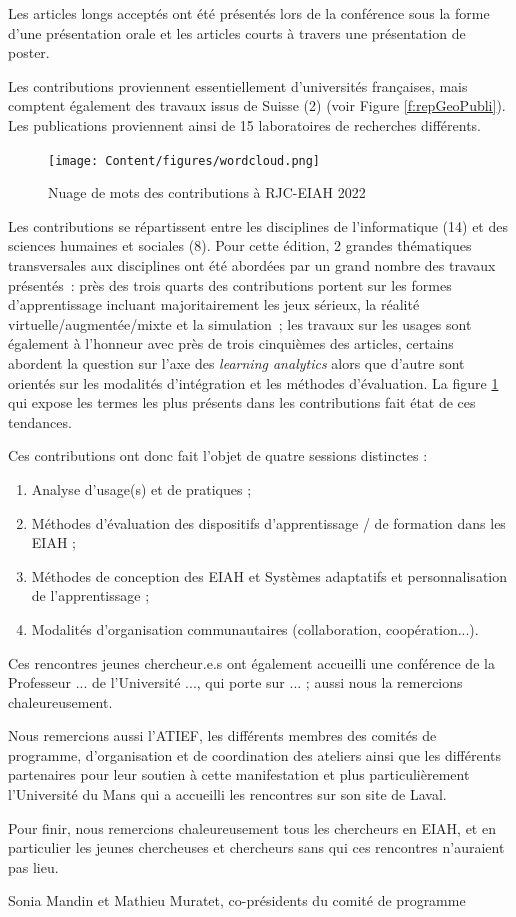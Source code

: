 Les articles longs acceptés ont été présentés lors de la conférence sous la forme d'une présentation orale et les articles courts à travers une présentation de poster.

Les contributions proviennent essentiellement d’universités françaises, mais comptent également des travaux issus de Suisse (2) (voir Figure \ref{f:repGeoPubli}). Les publications proviennent ainsi de 15 laboratoires de recherches différents.

\begin{figure}[!h]
	\centering
	\texttt{[image: Content/figures/wordcloud.png]}
	\caption{Nuage de mots des contributions à RJC-EIAH 2022}
	\label{f:wordCloud}
\end{figure}

Les contributions se répartissent entre les disciplines de l’informatique (14) et des sciences humaines et sociales (8). Pour cette édition, 2 grandes thématiques transversales aux disciplines ont été abordées par un grand nombre des travaux présentés~: près des trois quarts des contributions portent sur les formes d'apprentissage incluant majoritairement les jeux sérieux, la réalité virtuelle/augmentée/mixte et la simulation~; les travaux sur les usages sont également à l'honneur avec près de trois cinquièmes des articles, certains abordent la question sur l'axe des \textit{learning analytics} alors que d'autre sont orientés sur les modalités d'intégration et les méthodes d'évaluation. La figure \ref{f:wordCloud} qui expose les termes les plus présents dans les contributions fait état de ces tendances.

Ces contributions ont donc fait l’objet de quatre sessions distinctes : 
\begin{enumerate}
	\item Analyse d'usage(s) et de pratiques ;
	\item Méthodes d'évaluation des dispositifs d'apprentissage / de formation dans les EIAH ;
	\item Méthodes de conception des EIAH et Systèmes adaptatifs et personnalisation de l'apprentissage ;
	\item Modalités d'organisation communautaires (collaboration, coopération...).
\end{enumerate}

Ces rencontres jeunes chercheur.e.s ont également accueilli une conférence de la Professeur ... de l'Université ..., qui porte sur ... ; aussi nous la remercions chaleureusement.

Nous remercions aussi l’ATIEF, les différents membres des comités de programme, d'organisation et de coordination des ateliers ainsi que les différents partenaires pour leur soutien à cette manifestation et plus particulièrement l’Université du Mans qui a accueilli les rencontres sur son site de Laval.

Pour finir, nous remercions chaleureusement tous les chercheurs en EIAH, et en particulier les jeunes chercheuses et chercheurs sans qui ces rencontres n’auraient pas lieu.

\vspace*{2em}
\begin{flushright}
	Sonia Mandin et Mathieu Muratet, co-présidents du comité de programme
\end{flushright}